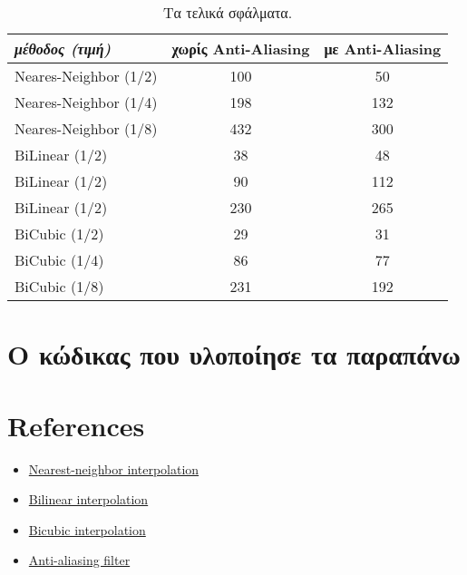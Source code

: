 \documentclass[11pt]{scrartcl} %
\begin{document}
\begin{table}[h] %
	\centering %
	\begin{tabular}{l c c}
		\toprule
		\textit{μέθοδος (τιμή)} & \textbf{χωρίς Αnti-Αliasing} & \textbf{με Αnti-Αliasing} \\
		\midrule
		\midrule
		Neares-Neighbor (1/2) & 100 & 50\\
		Neares-Neighbor (1/4) & 198 & 132\\
		Neares-Neighbor (1/8) & 432 & 300\\
		\midrule
		BiLinear (1/2) & 38 & 48\\
		BiLinear (1/2) & 90 & 112\\
		BiLinear (1/2) & 230 & 265\\
		\midrule
		BiCubic (1/2) & 29 & 31\\
		BiCubic (1/4) & 86 & 77\\
		BiCubic (1/8) & 231 & 192\\
		\bottomrule
	\end{tabular}
	\caption{Τα τελικά σφάλματα.}
\end{table}


\section{Ο κώδικας που υλοποίησε τα παραπάνω}


\section{References}


\begin{itemize}
  \item \href{https://en.wikipedia.org/wiki/Nearest-neighbor_interpolation}{Nearest-neighbor interpolation}
  \item \href{https://en.wikipedia.org/wiki/Bilinear_interpolation}{Bilinear interpolation}
  \item \href{https://en.wikipedia.org/wiki/Bicubic_interpolation}{Bicubic interpolation}
  \item \href{https://en.wikipedia.org/wiki/Anti-aliasing_filter}{Anti-aliasing filter}
\end{itemize}
\end{document}
